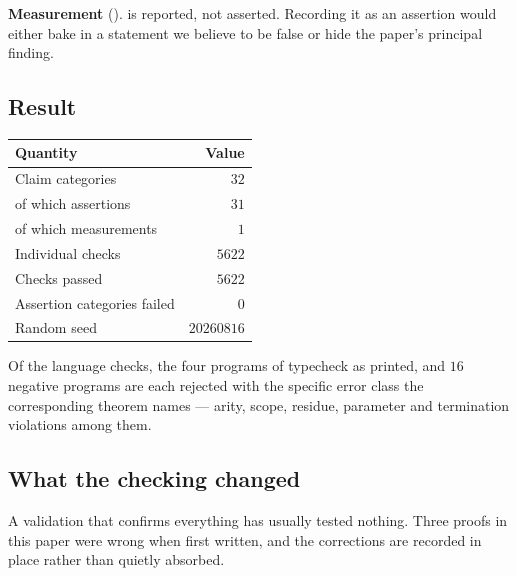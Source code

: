 \documentclass[11pt,twocolumn,a4paper]{article}
\theoremstyle{plain}
\theoremstyle{definition}
\theoremstyle{remark}
\begin{document}
\textbf{Measurement} ().  is reported,
not asserted. Recording it as an assertion would either bake in a
statement we believe to be false or hide the paper's principal finding.

\subsection{Result}

\begin{center}
\begin{tabular}{@{}lr@{}}
\toprule
Quantity & Value \\
\midrule
Claim categories & $32$ \\
\quad of which assertions & $31$ \\
\quad of which measurements & $1$ \\
Individual checks & $5622$ \\
Checks passed & $5622$ \\
Assertion categories failed & $0$ \\
Random seed & $20260816$ \\
\bottomrule
\end{tabular}
\end{center}

\noindent Of the language checks, the four programs of
 typecheck as printed, and $16$ negative programs are
each rejected with the specific error class the corresponding theorem
names --- arity, scope, residue, parameter and termination violations
among them.

\subsection{What the checking changed}

A validation that confirms everything has usually tested nothing. Three
proofs in this paper were wrong when first written, and the corrections
are recorded in place rather than quietly absorbed.
\end{document}
